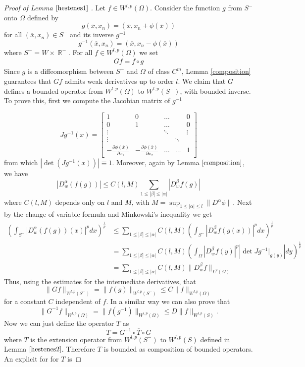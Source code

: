 \documentclass[12pt]{article}
\theoremstyle{definition}
\DeclareMathOperator\rr{\mathbb{R}}
\begin{document}
\begin{proof}[Proof of Lemma $\ref{hestenes1}$ ]
Let $f \in W^{l,p}(\Omega).$  Consider the function $g$ from $S^-$ onto $\Omega$ defined by
\[  g(\overline x, x_n)= (\overline x , x_n+ \phi(\overline x))\]
for all $(\overline x, x_n) \in S^-$
and its inverse  $g^{-1}$
\[  g^{-1}(\overline x, x_n)= (\overline x , x_n- \phi(\overline x))\]
where $S^-=W \times \rr^-$. For all $f \in W^{l,p}(\Omega)$ we set
\begin{align*}
 Gf=f \circ g
\end{align*}
Since $g$ is a diffeomorphism between $S^-$ and $\Omega$ of class $C^m$, Lemma \ref{composition} guarantees that $Gf$ admits weak derivatives up to order $l$. We claim that $G$ defines a bounded operator from $W^{l,p}(\Omega)$ to $W^{l,p}(S^-)$, with bounded inverse. To prove this, first we compute the Jacobian matrix of $g^{-1}$

\[ Jg^{-1}(x)= \begin{bmatrix}
		1             &             0  &            \dots &            &0 \\
		0             & 1              &   \dots           &            & 0\\
		\vdots    &                 &  \ddots           &  & \vdots\\
		\vdots    &                 &           &\ddots    &\\
		-\frac{\partial \phi(\overline x)}{\partial x_1} &-\frac{\partial \phi(\overline x)}{\partial x_2}& \dots & \dots & 1 
	\end{bmatrix}
\]
from which $|\det(Jg^{-1}(x))| \equiv 1 $. Moreover, again by Lemma $\ref{composition}$, we have
\[ |D^{\alpha}_w(f(g))| \le C(l,M) \sum_{1\le |\beta|\le|\alpha| }|D^{\beta}_wf(g)|\]
where $C(l,M)$ depends only on $l$ and $M$, with $M= \sup_{1\le|\alpha|\le l} \| D^\alpha \phi \|$.
Next by the change of variable formula and Minkowski's inequality we get
\begin{align*}
 \left( \int_{S^-} |D^{\alpha}_w(f(g))(x)|^p dx \right)^{\frac{1}{p}} & \le \sum_{1\le |\beta|\le|\alpha| } C(l,M) \left( \int_{S^-} |D^{\beta}_wf(g(x))|^p  dx\right)^{\frac{1}{p}}  \\
										      &=  \sum_{1\le |\beta|\le|\alpha| } C(l,M)\left(  \int_\Omega |D^{\beta}_wf(y)|^p |\det Jg^{-1}\big|_{g(y)}|  dy\right)^{\frac{1}{p}}  \\
  											&=  \sum_{1\le |\beta|\le|\alpha| } C(l,M) \|D^{\beta}_wf \|_{L^p(\Omega)}					
\end{align*}
Thus, using the estimates for the intermediate derivatives, that
\[ \| Gf\|_{W^{l,p}(S^-)} =\| f(g)\|_{W^{l,p}(S^-)} \le C \| f\|_{W^{l,p}(\Omega)}\]
for a constant $C$ independent of $f$. In a similar way we can also prove that 
\[ \| G^{-1}f\|_{W^{l,p}(\Omega)}=\| f(g^{-1})\|_{W^{l,p}(\Omega)} \le D \| f\|_{W^{l,p}(S)}.\]
Now we can just define the operator $T$ as
\[  T=G^{-1} \circ \overline T \circ G\]
where $\overline T$ is the extension operator from $W^{l,p}(S^-)$ to $W^{l,p}(S)$ defined in Lemma $\ref{hestenes2}$. Therefore $T$ is bounded as composition of bounded operators. An explicit for for $T$ is


\end{proof}
\end{document}
